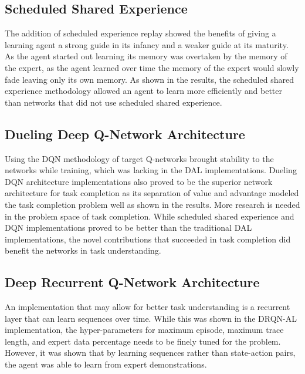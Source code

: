 \documentclass[12pt,american]{report}
\begin{document}
\subsection{Scheduled Shared Experience}
The addition of scheduled experience replay showed the benefits of giving a learning agent a strong guide in its infancy and a weaker guide at its maturity.  As the agent started out learning its memory was overtaken by the memory of the expert, as the agent learned over time the memory of the expert would slowly fade leaving only its own memory.  As shown in the results, the scheduled shared experience methodology allowed an agent to learn more efficiently and better than networks that did not use scheduled shared experience.

\subsection{Dueling Deep Q-Network Architecture}
Using the DQN methodology of target Q-networks brought stability to the networks while training, which was lacking in the DAL implementations.  Dueling DQN architecture implementations also proved to be the superior network architecture for task completion as its separation of value and advantage modeled the task completion problem well as shown in the results. More research is needed in the problem space of task completion.  While scheduled shared experience and DQN implementations proved to be better than the traditional DAL implementations, the novel contributions that succeeded in task completion did benefit the networks in task understanding.

\subsection{Deep Recurrent Q-Network Architecture}
An implementation that may allow for better task understanding is a recurrent layer that can learn sequences over time.  While this was shown in the DRQN-AL implementation, the hyper-parameters for maximum episode, maximum trace length, and expert data percentage needs to be finely tuned for the problem.  However, it was shown that by learning sequences rather than state-action pairs, the agent was able to learn from expert demonstrations. 
\end{document}
